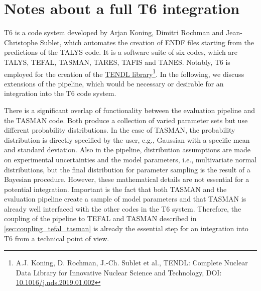 \documentclass[12pt,a4paper]{scrartcl}
\begin{document}
 \section{Notes about a full T6 integration}
 T6 is a code system developed by Arjan Koning, Dimitri Rochman and Jean-Christophe Sublet, which automates the creation of ENDF files starting from the predictions of the TALYS code.
 It is a software suite of six codes, which are TALYS, TEFAL, TASMAN, TARES, TAFIS and TANES.
 Notably, T6 is employed for the creation of the \href{https://tendl.web.psi.ch/tendl_2019/tendl2019.html}{TENDL library}\footnote{A.J. Koning, D. Rochman, J.-Ch. Sublet et al., TENDL: Complete Nuclear Data Library for Innovative Nuclear Science and Technology, DOI: \href{https://doi.org/10.1016/j.nds.2019.01.002}{10.1016/j.nds.2019.01.002}}.
 In the following, we discuss extensions of the pipeline, which would be necessary or desirable for an integration into the T6 code system.
 
 There is a significant overlap of functionality between the evaluation pipeline and the TASMAN code.
 Both produce a collection of varied parameter sets but use different probability distributions.
 In the case of TASMAN, the probability distribution is directly specified by the user, e.g., Gaussian with a specific mean and standard deviation.
 Also in the pipeline, distribution assumptions are made on experimental uncertainties and the model parameters, i.e., multivariate normal distributions, but the final distribution for parameter sampling is the result of a Bayesian procedure.
 However, these mathematical details are not essential for a potential integration.
 Important is the fact that both TASMAN and the evaluation pipeline create a sample of model parameters and that TASMAN is already well interfaced with the other codes in the T6 system.
 Therefore, the coupling of the pipeline to TEFAL and TASMAN described in \cref{sec:coupling_tefal_tasman} is already the essential step for an integration into T6 from a technical point of view.
\end{document}
